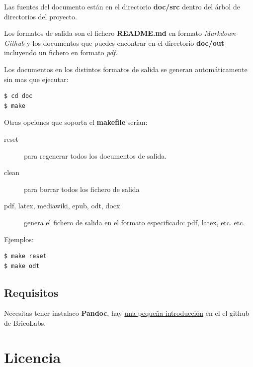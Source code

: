 \documentclass[12pt,spanish,]{scrartcl}
\begin{document}
Las fuentes del documento están en el directorio \textbf{doc/src} dentro
del árbol de directorios del proyecto.

Los formatos de salida son el fichero \textbf{README.md} en formato
\emph{Markdown-Github} y los documentos que puedes encontrar en el
directorio \textbf{doc/out} incluyendo un fichero en formato \emph{pdf}.

Los documentos en los distintos formatos de salida se generan
automáticamente sin mas que ejecutar:

\begin{verbatim}
$ cd doc
$ make
\end{verbatim}

Otras opciones que soporta el \textbf{makefile} serían:

\begin{description}
\item[reset]
para regenerar todos los documentos de salida.
\item[clean]
para borrar todos los fichero de salida
\item[pdf, latex, mediawiki, epub, odt, docx]
genera el fichero de salida en el formato especificado: pdf, latex, etc.
etc.
\end{description}

Ejemplos:

\begin{verbatim}
$ make reset
$ make odt
\end{verbatim}

\subsection{Requisitos}\label{requisitos}

Necesitas tener instalaco \textbf{Pandoc}, hay
\href{https://github.com/brico-labs/pandoc_basico}{una pequeña
introducción} en el el github de BricoLabs.

\section{Licencia}\label{licencia}
\end{document}
